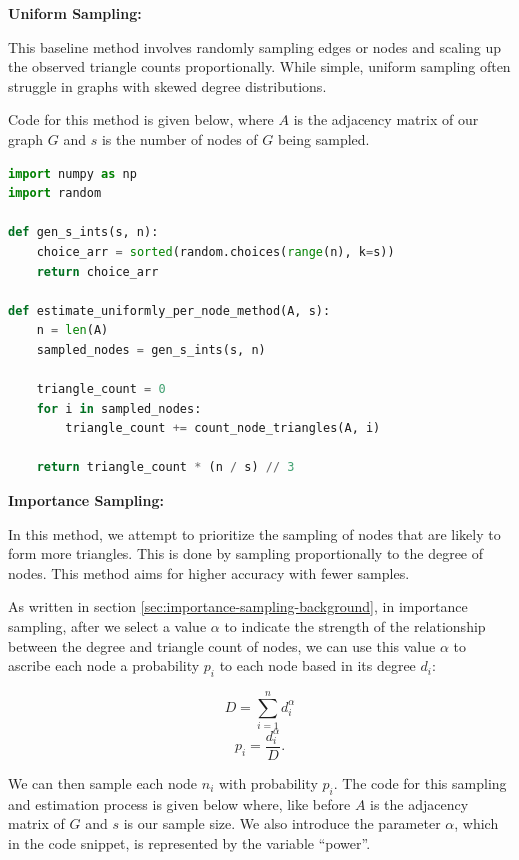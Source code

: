 \documentclass[11pt]{article}
\newcommand{\subsubsubsection}[1]{
  \vspace{1em} %
  \noindent\textbf{#1} %
  \vspace{0.5em} %
}
\begin{document}
\subsubsubsection{Uniform Sampling:}

This baseline method involves randomly sampling edges or nodes and scaling up the observed triangle counts proportionally.
While simple, uniform sampling often struggle in graphs with skewed degree distributions.

Code for this method is given below, where $A$ is the adjacency matrix of our graph $G$ and $s$ is the number of nodes of $G$ being sampled.

\begin{lstlisting}[language=Python]
import numpy as np
import random

def gen_s_ints(s, n):
    choice_arr = sorted(random.choices(range(n), k=s))
    return choice_arr

def estimate_uniformly_per_node_method(A, s):
    n = len(A)
    sampled_nodes = gen_s_ints(s, n)

    triangle_count = 0
    for i in sampled_nodes:
        triangle_count += count_node_triangles(A, i)

    return triangle_count * (n / s) // 3

\end{lstlisting}

\textbf{Importance Sampling:}

In this method, we attempt to prioritize the sampling of nodes that are likely to form more triangles.
This is done by sampling proportionally to the degree of nodes.
This method aims for higher accuracy with fewer samples.


As written in section \ref{sec:importance-sampling-background}, in importance sampling, after we select a value $\alpha$ to indicate the strength of the relationship between the degree and triangle count of nodes, we can use this value $\alpha$ to ascribe each node a probability $p_i$ to each node based in its degree $d_i$:

\[
D = \sum_{i = 1}^{n} d_i^\alpha
\]
\[
p_i = \frac{d_i^\alpha}{D}.
\]

We can then sample each node $n_i$ with probability $p_i$.
The code for this sampling and estimation process is given below where, like before $A$ is the adjacency matrix of $G$ and $s$ is our sample size.
We also introduce the parameter $\alpha$, which in the code snippet, is represented by the variable ``power''.
\end{document}
